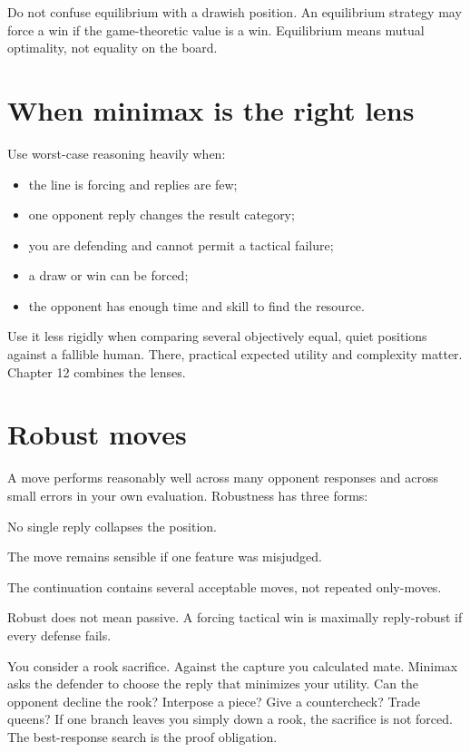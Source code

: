 Do not confuse equilibrium with a drawish position. An equilibrium strategy may force a win if the game-theoretic value is a win. Equilibrium means mutual optimality, not equality on the board.

\section{When minimax is the right lens}
Use worst-case reasoning heavily when:

\begin{itemize}[leftmargin=1.4em]
\item the line is forcing and replies are few;
\item one opponent reply changes the result category;
\item you are defending and cannot permit a tactical failure;
\item a draw or win can be forced;
\item the opponent has enough time and skill to find the resource.
\end{itemize}

Use it less rigidly when comparing several objectively equal, quiet positions against a fallible human. There, practical expected utility and complexity matter. Chapter 12 combines the lenses.

\section{Robust moves}
A  move performs reasonably well across many opponent responses and across small errors in your own evaluation. Robustness has three forms:

\begin{description}[style=nextline,leftmargin=2.4em,labelsep=.5em]
\item[Reply robustness.] No single reply collapses the position.
\item[Evaluation robustness.] The move remains sensible if one feature was misjudged.
\item[Execution robustness.] The continuation contains several acceptable moves, not repeated only-moves.
\end{description}

Robust does not mean passive. A forcing tactical win is maximally reply-robust if every defense fails.

\begin{workedbox}[title={Worked example: the sacrifice test}]
You consider a rook sacrifice. Against the capture you calculated mate. Minimax asks the defender to choose the reply that minimizes your utility. Can the opponent decline the rook? Interpose a piece? Give a countercheck? Trade queens? If one branch leaves you simply down a rook, the sacrifice is not forced. The best-response search is the proof obligation.
\end{workedbox}

